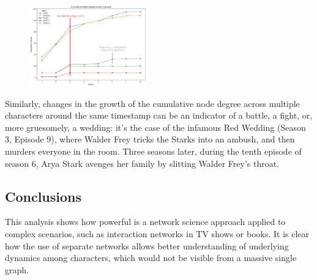 \documentclass[10pt,twocolumn,letterpaper]{article}
\begin{document}
\begin{figure}[!h]
    \centering
    \includegraphics[width=0.45\textwidth]{img/all_seasons/csum_degree_redwedding.jpg}
\end{figure}

Similarly, changes in the growth of the cumulative node degree across multiple characters around the same timestamp can be an indicator of a battle, a fight, or, more gruesomely, a wedding: it's the case of the infamous Red Wedding (Season 3, Episode 9), where Walder Frey tricks the Starks into an ambush, and then murders everyone in the room. Three seasons later, during the tenth episode of season 6, Arya Stark avenges her family by slitting Walder Frey's throat.

\subsection{Conclusions}

This analysis shows how powerful is a network science approach applied to complex scenarios, such as interaction networks in TV shows or books. It is clear how the use of separate networks allows better understanding of underlying dynamics among characters, which would not be visible from a massive single graph.  

{\small


}
\end{document}
